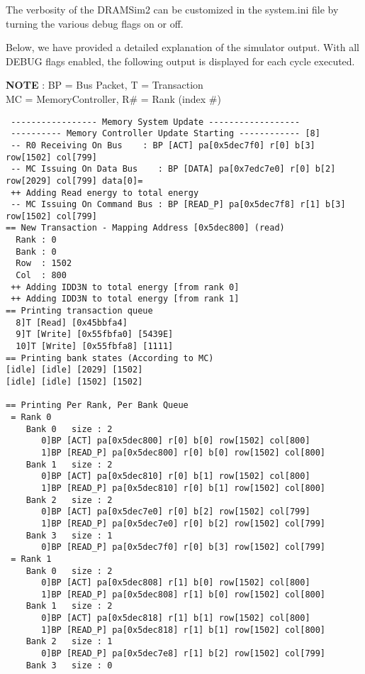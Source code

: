 \documentclass[11pt]{article}
\begin{document}
\noindent\begin{minipage}{\textwidth}
The verbosity of the DRAMSim2 can be customized in the system.ini file by turning the
various debug flags on or off. 

Below, we have provided a detailed explanation of the simulator output.  With
all DEBUG flags enabled, the following output is displayed for each cycle
executed.  

   \textbf{NOTE} : BP = Bus Packet, T  = Transaction \\ 
					MC = MemoryController, R\# = Rank (index \#)
  
\begin{lstlisting}
 ----------------- Memory System Update ------------------
 ---------- Memory Controller Update Starting ------------ [8]
 -- R0 Receiving On Bus    : BP [ACT] pa[0x5dec7f0] r[0] b[3] row[1502] col[799]
 -- MC Issuing On Data Bus    : BP [DATA] pa[0x7edc7e0] r[0] b[2] row[2029] col[799] data[0]=
 ++ Adding Read energy to total energy
 -- MC Issuing On Command Bus : BP [READ_P] pa[0x5dec7f8] r[1] b[3] row[1502] col[799]
== New Transaction - Mapping Address [0x5dec800] (read)
  Rank : 0
  Bank : 0
  Row  : 1502
  Col  : 800
 ++ Adding IDD3N to total energy [from rank 0]
 ++ Adding IDD3N to total energy [from rank 1]
== Printing transaction queue
  8]T [Read] [0x45bbfa4]
  9]T [Write] [0x55fbfa0] [5439E]
  10]T [Write] [0x55fbfa8] [1111]
== Printing bank states (According to MC)
[idle] [idle] [2029] [1502] 
[idle] [idle] [1502] [1502] 

== Printing Per Rank, Per Bank Queue
 = Rank 0
    Bank 0   size : 2
       0]BP [ACT] pa[0x5dec800] r[0] b[0] row[1502] col[800]
       1]BP [READ_P] pa[0x5dec800] r[0] b[0] row[1502] col[800]
    Bank 1   size : 2
       0]BP [ACT] pa[0x5dec810] r[0] b[1] row[1502] col[800]
       1]BP [READ_P] pa[0x5dec810] r[0] b[1] row[1502] col[800]
    Bank 2   size : 2
       0]BP [ACT] pa[0x5dec7e0] r[0] b[2] row[1502] col[799]
       1]BP [READ_P] pa[0x5dec7e0] r[0] b[2] row[1502] col[799]
    Bank 3   size : 1
       0]BP [READ_P] pa[0x5dec7f0] r[0] b[3] row[1502] col[799]
 = Rank 1
    Bank 0   size : 2
       0]BP [ACT] pa[0x5dec808] r[1] b[0] row[1502] col[800]
       1]BP [READ_P] pa[0x5dec808] r[1] b[0] row[1502] col[800]
    Bank 1   size : 2
       0]BP [ACT] pa[0x5dec818] r[1] b[1] row[1502] col[800]
       1]BP [READ_P] pa[0x5dec818] r[1] b[1] row[1502] col[800]
    Bank 2   size : 1
       0]BP [READ_P] pa[0x5dec7e8] r[1] b[2] row[1502] col[799]
    Bank 3   size : 0
\end{lstlisting}
\end{minipage}
\end{document}

